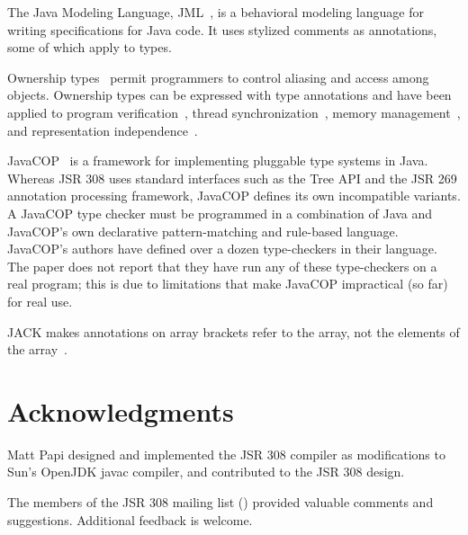\documentclass[10pt]{article}
\begin{document}
The Java Modeling Language, JML~\cite{LeavensBR2006:JML}, is a behavioral
modeling language for writing specifications for Java code.  It uses
stylized comments as annotations, some of which apply to types.


Ownership types~\cite{ClarkePN98,Boyapati2004:PhD,Clark2001,ClarkD2002,PotaninNCB2006,NobleVP98,DietlM2005,LeinoM2004,YuP2006}
permit programmers to control aliasing and access among objects.  Ownership
types can be expressed with type annotations
and have been applied to program
verification~\cite{LeinoM2004,Muller2002,MullerPHL2006}, thread
synchronization~\cite{BoyapatiLR2002,JacobsPLS2005}, memory
management~\cite{AndreaCGNVZ2006,BoyapatiSBR2003}, and representation
independence~\cite{BanerjeeN2002}.


JavaCOP~\cite{AndreaeNMM2006} is a framework for implementing pluggable
type systems in Java.  Whereas JSR 308 uses
standard
interfaces such as the Tree API and the JSR 269 annotation processing
framework, JavaCOP defines its own incompatible variants.
A JavaCOP type checker must be programmed in a combination of Java and
JavaCOP's own declarative pattern-matching and rule-based
language.
JavaCOP's authors have defined over a dozen
type-checkers in their language.  The paper does not report that they have
run any of these type-checkers on a real program; this is due to
limitations that make JavaCOP impractical (so far) for real use.


JACK makes annotations on array brackets refer to the array, not the
elements of the array~\cite{MalePPD2008}.


\section*{Acknowledgments}

Matt Papi designed and implemented the JSR 308 compiler as modifications to
Sun's OpenJDK javac compiler, and contributed to the JSR 308 design.

The members of the JSR 308 mailing list
() provided
valuable comments and suggestions.
%
Additional feedback is welcome.
\end{document}
